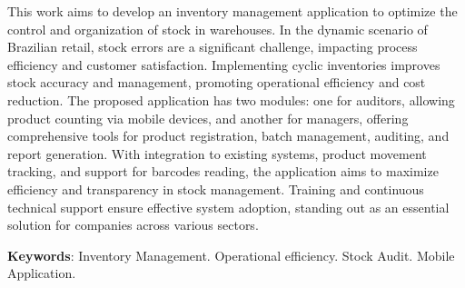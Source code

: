 This work aims to develop an inventory management application to optimize the control and organization of stock in warehouses. In the dynamic scenario of Brazilian retail, stock errors are a significant challenge, impacting process efficiency and customer satisfaction. Implementing cyclic inventories improves stock accuracy and management, promoting operational efficiency and cost reduction. The proposed application has two modules: one for auditors, allowing product counting via mobile devices, and another for managers, offering comprehensive tools for product registration, batch management, auditing, and report generation. With integration to existing systems, product movement tracking, and support for barcodes reading, the application aims to maximize efficiency and transparency in stock management. Training and continuous technical support ensure effective system adoption, standing out as an essential solution for companies across various sectors.

\textbf{Keywords}: Inventory Management. Operational efficiency. Stock Audit. Mobile Application.